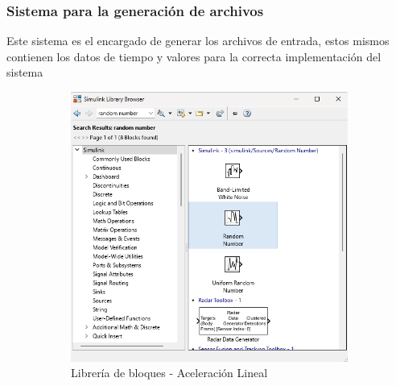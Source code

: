 \subsubsection{Sistema para la generación de archivos}

Este sistema es el encargado de generar los archivos de entrada, estos mismos contienen los datos de tiempo y valores para la correcta implementación del sistema

\begin{figure}[htbp]
    \centering
    \begin{subfigure}[b]{0.45\textwidth}
        \centering
        \includegraphics[width=\textwidth]{fig/Capitulo5/Caso_de_estudio_IMU/Generador_de_archivos/libreria_de_bloques_aceleracion_lineal.png}
        \caption{Librería de bloques - Aceleración Lineal}
        \label{fig:lib_bloques_linear_acceleration}
    \end{subfigure}
    \hfill
    \begin{subfigure}[b]{0.45\textwidth}
        \centering

\end{subfigure}
\end{figure}
